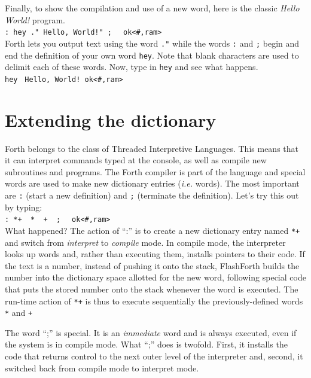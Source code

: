 \documentclass[12pt,a4paper]{article}
\begin{document}
\bigskip
Finally, to show the compilation and use of a new word,
here is the classic \textit{Hello World!} program. \vspace{7pt} \\
\verb?: hey ." Hello, World!" ;? \fbox{$\hookleftarrow$} \verb!  ok<#,ram>! \vspace{7pt} \\
Forth lets you output text using the word \verb!."! while the words \verb!:! and \verb!;!
begin and end the definition of your own word \verb!hey!.
Note that blank characters are used to delimit each of these words.
Now, type in \verb!hey! and see what happens. \vspace{7pt} \\
\verb!hey! \fbox{$\hookleftarrow$} \verb? Hello, World! ok<#,ram>? \vspace{7pt}


\newpage
\section{Extending the dictionary}
\label{sec:dictionary}
%
Forth belongs to the class of Threaded Interpretive Languages.
This means that it can interpret commands typed at the console,
as well as compile new subroutines and programs.
The Forth compiler is part of the language and special words are
used to make new dictionary entries (\textit{i.e.} words).
The most important are \verb!:! (start a new definition) and
\verb!;! (terminate the definition).
Let's try this out by typing: \vspace{7pt} \\
\verb!: *+  *  +  ;! \fbox{$\hookleftarrow$} \verb!  ok<#,ram>! \vspace{7pt} \\
What happened?
The action of ``:'' is to create a new dictionary entry named \verb!*+! and 
switch from \textit{interpret} to \textit{compile} mode.
In compile mode, the interpreter looks up words and, rather than executing them,
installs pointers to their code.
If the text is a number, instead of pushing it onto the stack, FlashForth builds
the number into the dictionary space allotted for the new word, 
following special code that puts the stored number onto the stack whenever the 
word is executed.
The run-time action of \verb!*+! is thus to execute sequentially the previously-defined words
\verb!*! and \verb!+!

\medskip
The word ``;'' is special.  
It is an \textit{immediate} word and is always executed, even if the system is in compile mode.
What ``;'' does is twofold.
First, it installs the code that returns control to the next outer level of the interpreter and,
second, it switched back from compile mode to interpret mode.
\end{document}

